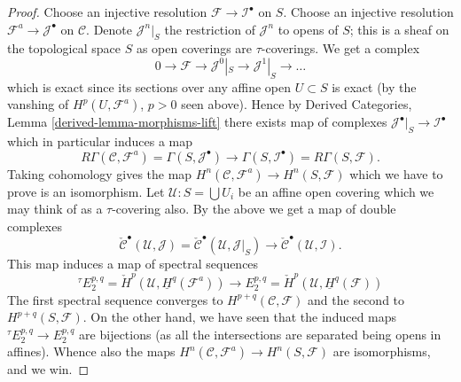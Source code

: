 \begin{proof}
\medskip\noindent
Choose an injective resolution $\mathcal{F} \to \mathcal{I}^\bullet$ on $S$.
Choose an injective resolution $\mathcal{F}^a \to \mathcal{J}^\bullet$
on $\mathcal{C}$. Denote $\mathcal{J}^n|_S$ the restriction of $\mathcal{J}^n$
to opens of $S$; this is a sheaf on the topological space $S$ as open
coverings are $\tau$-coverings. We get a complex
$$
0 \to \mathcal{F} \to \mathcal{J}^0|_S \to \mathcal{J}^1|_S \to \ldots
$$
which is exact since its sections over any affine open $U \subset S$
is exact (by the vanshing of $H^p(U, \mathcal{F}^a)$, $p > 0$ seen
above). Hence by
Derived Categories, Lemma \ref{derived-lemma-morphisms-lift}
there exists map of complexes
$\mathcal{J}^\bullet|_S \to \mathcal{I}^\bullet$ which in particular
induces a map
$$
R\Gamma(\mathcal{C}, \mathcal{F}^a)
=
\Gamma(S, \mathcal{J}^\bullet)
\longrightarrow
\Gamma(S, \mathcal{I}^\bullet)
=
R\Gamma(S, \mathcal{F}).
$$
Taking cohomology gives the map
$H^n(\mathcal{C}, \mathcal{F}^a) \to H^n(S, \mathcal{F})$ which
we have to prove is an isomorphism.
Let $\mathcal{U} : S = \bigcup U_i$ be an affine open covering
which we may think of as a $\tau$-covering also.
By the above we get a map of double complexes
$$
\check{\mathcal{C}}^\bullet(\mathcal{U}, \mathcal{J})
=
\check{\mathcal{C}}^\bullet(\mathcal{U}, \mathcal{J}|_S)
\longrightarrow
\check{\mathcal{C}}^\bullet(\mathcal{U}, \mathcal{I}).
$$
This map induces a map of spectral sequences
$$
{}^\tau\! E_2^{p, q} = \check{H}^p(\mathcal{U}, \underline{H}^q(\mathcal{F}^a))
\longrightarrow
E_2^{p, q} = \check{H}^p(\mathcal{U}, \underline{H}^q(\mathcal{F}))
$$
The first spectral sequence converges to
$H^{p + q}(\mathcal{C}, \mathcal{F})$ and the second to
$H^{p + q}(S, \mathcal{F})$. On the other hand, we have seen
that the induced maps ${}^\tau\! E_2^{p, q} \to E_2^{p, q}$ are
bijections (as all the intersections are separated being opens in affines).
Whence also the maps $H^n(\mathcal{C}, \mathcal{F}^a) \to H^n(S, \mathcal{F})$
are isomorphisms, and we win.
\end{proof}

